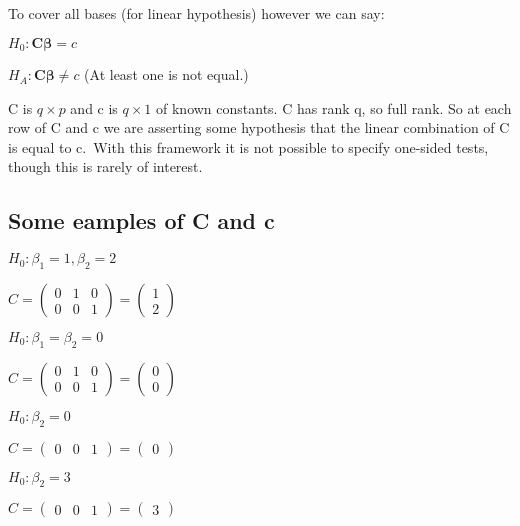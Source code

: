 \documentclass[
  letterpaper,
  DIV=11,
  numbers=noendperiod]{scrreprt}
\begin{document}
To cover all bases (for linear hypothesis) however we can say:

\(H_0 : \boldsymbol{C\beta} = c\)

\(H_A : \boldsymbol{C\beta} \neq c\) (At least one is not equal.)

C is \(q \times p\) and c is \(q \times 1\) of known constants. C has
rank q, so full rank. So at each row of C and c we are asserting some
hypothesis that the linear combination of C is equal to c.~With this
framework it is not possible to specify one-sided tests, though this is
rarely of interest.

\hypertarget{some-eamples-of-c-and-c}{%
\subsection{Some eamples of C and c}\label{some-eamples-of-c-and-c}}

\(H_0 : \beta_1 = 1, \beta_2=2\)

\(C = \begin{pmatrix} 0 & 1 & 0\\ 0 & 0 & 1 \end{pmatrix} = \begin{pmatrix} 1 \\ 2 \end{pmatrix}\)

\hfill\break

\(H_0 : \beta_1 = \beta_2 = 0\)

\(C = \begin{pmatrix} 0 & 1 & 0\\ 0 & 0 & 1 \end{pmatrix} = \begin{pmatrix} 0 \\ 0 \end{pmatrix}\)

\hfill\break

\(H_0 : \beta_2 = 0\)

\(C = \begin{pmatrix} 0 & 0 & 1 \end{pmatrix} = \begin{pmatrix} 0 \end{pmatrix}\)

\hfill\break

\(H_0 : \beta_2 = 3\)

\(C = \begin{pmatrix} 0 & 0 & 1 \end{pmatrix} = \begin{pmatrix} 3 \end{pmatrix}\)
\end{document}
